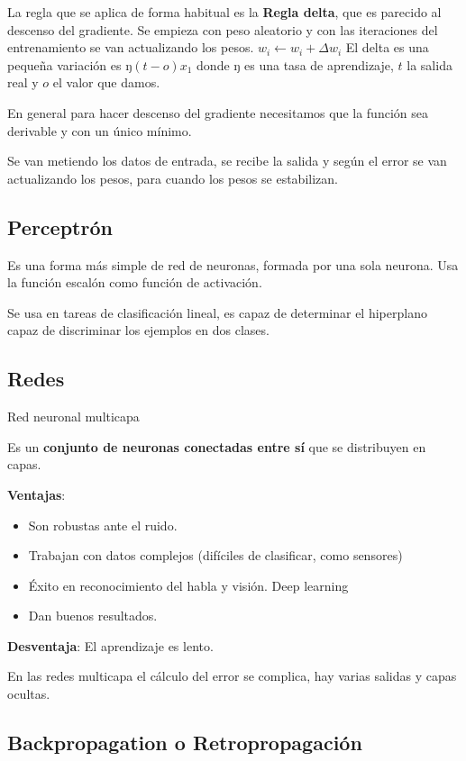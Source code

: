 \documentclass[12pt, twoside, openright]{report} %
\begin{document}
La regla que se aplica de forma habitual es la \textbf{Regla delta}, que es parecido al descenso del gradiente. Se empieza con peso aleatorio y con las iteraciones del entrenamiento se van actualizando los pesos. \(w_i \leftarrow w_i+\Delta w_i\) El delta es una pequeña variación es ŋ\((t-o)x_1\) donde ŋ es una tasa de aprendizaje, \(t\) la salida real y \(o\) el valor que damos.

En general para hacer descenso del gradiente necesitamos que la función sea derivable y con un único mínimo.

Se van metiendo los datos de entrada, se recibe la salida y según el error se van actualizando los pesos, para cuando los pesos se estabilizan.

\subsection{Perceptrón}

Es una forma más simple de red de neuronas, formada por una sola neurona. Usa la función escalón como función de activación.

Se usa en tareas de clasificación lineal, es capaz de determinar el hiperplano capaz de discriminar los ejemplos en dos clases.

\subsection{Redes}

Red neuronal multicapa

Es un \textbf{conjunto de neuronas conectadas entre sí} que se distribuyen en capas.

\textbf{Ventajas}:
\vspace{-.5cm}
\begin{itemize}
	\item Son robustas ante el ruido.
	\item Trabajan con datos complejos (difíciles de clasificar, como sensores)
	\item Éxito en reconocimiento del habla y visión. Deep learning
	\item Dan buenos resultados.
\end{itemize}

\textbf{Desventaja}: El aprendizaje es lento.

En las redes multicapa el cálculo del error se complica, hay varias salidas y capas ocultas.

\subsection{Backpropagation o Retropropagación}
\end{document}
